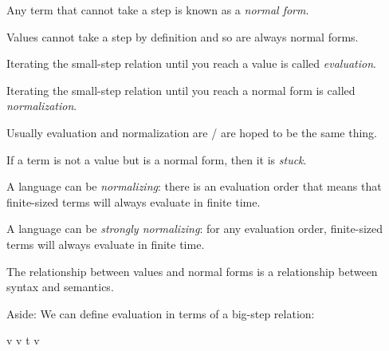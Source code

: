 \begin{frame}[c]
  Any term that cannot take a step is known as a {\it normal form}.
\end{frame}

\begin{frame}[c]
  Values cannot take a step by definition and so are always normal forms.
\end{frame}

\begin{frame}[c]
  Iterating the small-step relation until you reach a value is called {\it evaluation}.
\end{frame}

\begin{frame}[c]
  Iterating the small-step relation until you reach a normal form is called {\it normalization}.
\end{frame}

\begin{frame}[c]
  Usually evaluation and normalization are / are hoped to be the same thing.
\end{frame}

\begin{frame}[c]
  If a term is not a value but is a normal form, then it is {\it stuck}.
\end{frame}

\begin{frame}[c]
  A language can be {\it normalizing}: there is an evaluation order that means that finite-sized terms will always evaluate in finite time.
\end{frame}

\begin{frame}[c]
  A language can be {\it strongly normalizing}: for any evaluation order, finite-sized terms will always evaluate in finite time.
\end{frame}

\begin{frame}[c]
  The relationship between values and normal forms is a relationship between syntax and semantics.
\end{frame}

\begin{frame}

  Aside: We can define evaluation in terms of a big-step relation:
  
          {v \Rightarrow v}
          {t \Rightarrow v}
\end{frame}


